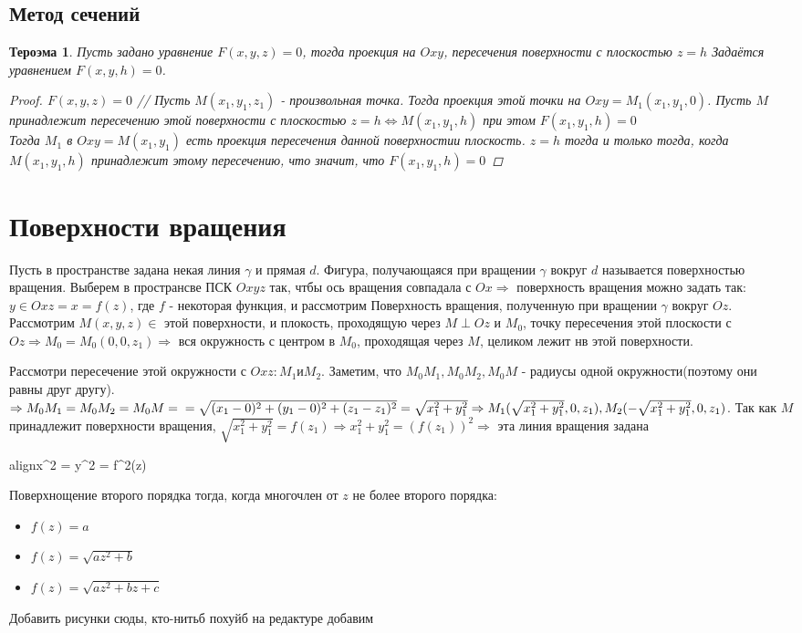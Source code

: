 \documentclass[oneside]{book}
\newcommand{\boxedeq}[2]{\begin{empheq}[box={\fboxsep=6pt\fbox}]{align}\label{#1}#2\end{empheq}}
\newtheorem{thm}{Тероэма}[chapter] %
\begin{document}
\begin{enumerate}
\begin{itemize}
\begin{enumerate}
\section{Метод сечений}
\begin{thm}
  Пусть задано уравнение  $F(x, y, z) = 0$, тогда проекция на $Oxy$, пересечения поверхности с плоскостью $z = h$ Задаётся уравнением  $F(x, y, h) = 0$.
  \begin{proof}
     $F(x, y, z) = 0$ //
     Пусть $M(x_1, y_1, z_1)$ - произвольная точка. Тогда проекция этой точки на $Oxy = M_1(x_1, y_1, 0)$.
     Пусть $M$ принадлежит пересечению этой поверхности с  плоскостью $z = h \Leftrightarrow M(x_1, y_1, h)$ при этом  $F(x_1, y_1, h) = 0$\\
     Тогда $M_1$ в $Oxy = M(x_1, y_1)$ есть проекция пересечения данной поверхностии плоскость. $z = h$ тогда и только тогда, когда
     $M(x_1, y_1, h)$ принадлежит этому пересечению, что значит, что $F(x_1, y_1, h) = 0$
   \end{proof}
\end{thm}
\setcounter{chapter}{46}
\chapter {Поверхности вращения}
Пусть в пространстве задана некая линия $\gamma$ и прямая $d$. Фигура, получающаяся при вращении $\gamma$ вокруг $d$ называется поверхностью вращения.
Выберем в пространсве ПСК $Oxyz$ так, чтбы ось вращения совпадала с $Ox \Rightarrow$ поверхность вращения можно задать так:
$y \in Oxz = x = f(z)$, где $f$ - некоторая функция, и рассмотрим Поверхность вращения, полученную при вращении $\gamma$ вокруг $Oz$.
Рассмотрим $M(x, y, z) \in $ этой поверхности, и плокость, проходящую через $M \perp Oz$ и $M_0$, точку пересечения этой плоскости с $Oz \Rightarrow M_0 = M_0(0, 0, z_1) \Rightarrow $ вся окружность с центром в $M_0$, проходящая через $M$, целиком лежит нв этой поверхности. \par Рассмотри пересечение этой окружности с $Oxz: M_1 $и$ M_2$.
Заметим, что $M_0 M_1, M_0 M_2, M_0 M$ - радиусы одной окружности(поэтому они равны друг другу). $\Rightarrow M_0 M_1 = M_0 M_2 = M_0 M = \\ = \sqrt{(x_1 - 0)^2 + (y_1 - 0)^2 + (z_1-z_1)^2} = \sqrt{x_1^2 + y_1^2} \\ \Rightarrow M_1(\sqrt{x_1^2 + y_1^2}, 0, z_1), M_2(-\sqrt{x_1^2 + y_1^2}, 0, z_1)$. Так как $M$ принадлежит поверхности вращения, $\sqrt{x_1^2 + y_1^2} = f(z_1) \Rightarrow x_1^2 + y_1^2 = (f(z_1))^2 \Rightarrow $ эта линия вращения задана
\boxedeq{eq:*}{x^2 = y^2 = f^2(z)}
Поверхнощение второго порядка тогда, когда многочлен от $z$ не более второго порядка:
\begin{itemize}
  \item $f(z) = a$
  \item $f(z) = \sqrt{az^2 + b}$
  \item $f(z) = \sqrt{az^2 + bz + c}$
\end{itemize}
{\Large Добавить рисунки сюды, кто-нитьб похуйб на редактуре добавим}
\setcounter{chapter}{47}

\end{enumerate}
\end{itemize}
\end{enumerate}
\end{document}

